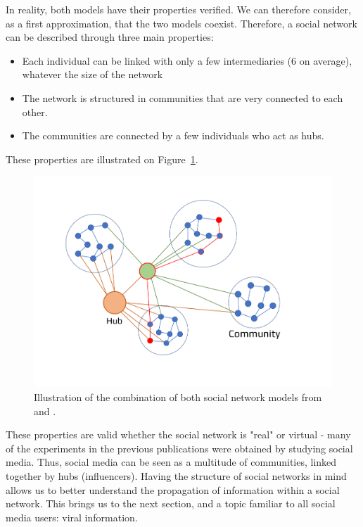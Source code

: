 In reality, both models have their properties verified.
We can therefore consider, as a first approximation, that the two models coexist.
Therefore, a social network can be described through three main properties:
\begin{itemize}
    \item Each individual can be linked with only a few intermediaries (6 on average), whatever the size of the network
    \item The network is structured in communities that are very connected to each other.
    \item The communities are connected by a few individuals who act as hubs.
\end{itemize}
These properties are illustrated on Figure~\ref{context:social-network}.
\begin{figure}
    \centering
    \includegraphics[width=\textwidth]{figures/network.pdf}
    \caption{Illustration of the combination of both social network models from \cite{wattsCollectiveDynamicsSmallworld1998} and \cite{barabasiEmergenceScalingRandom1999}.}
    \label{context:social-network}
\end{figure}

These properties are valid whether the social network is "real" or virtual - many of the experiments in the previous publications were obtained by studying social media.
Thus, social media can be seen as a multitude of communities, linked together by hubs (influencers).
Having the structure of social networks in mind allows us to better understand the propagation of information within a social network.
This brings us to the next section, and a topic familiar to all social media users: viral information.

